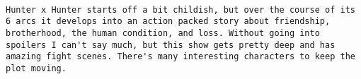 \documentclass[
]{article}
\begin{document}
\begin{verbatim}
                                                                                                                                                                                                                                                                                                                                                                                                                                                                                                                                                                                                                                                                                                                                                                                                                                                                                                                                                                                                                                                                                                                                                                                                                                                                                                                                                                                           Hunter x Hunter starts off a bit childish, but over the course of its 6 arcs it develops into an action packed story about friendship, brotherhood, the human condition, and loss. Without going into spoilers I can't say much, but this show gets pretty deep and has amazing fight scenes. There's many interesting characters to keep the plot moving.

\end{verbatim}
\end{document}
